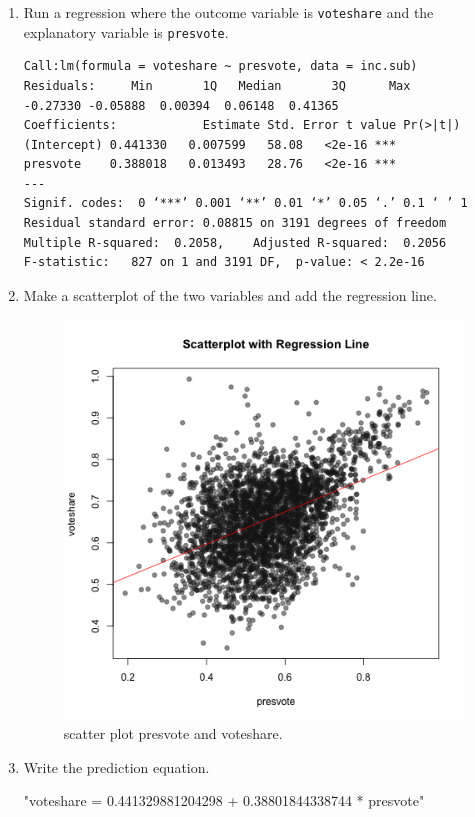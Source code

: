 \documentclass[12pt,letterpaper]{article}
\begin{document}
	\begin{enumerate}
		\item Run a regression where the outcome variable is \texttt{voteshare} and the explanatory variable is \texttt{presvote}.
 	
\begin{verbatim}
Call:lm(formula = voteshare ~ presvote, data = inc.sub)
Residuals:     Min       1Q   Median       3Q      Max 
-0.27330 -0.05888  0.00394  0.06148  0.41365 
Coefficients:            Estimate Std. Error t value Pr(>|t|)    
(Intercept) 0.441330   0.007599   58.08   <2e-16 ***
presvote    0.388018   0.013493   28.76   <2e-16 ***
---
Signif. codes:  0 ‘***’ 0.001 ‘**’ 0.01 ‘*’ 0.05 ‘.’ 0.1 ‘ ’ 1
Residual standard error: 0.08815 on 3191 degrees of freedom
Multiple R-squared:  0.2058,	Adjusted R-squared:  0.2056 
F-statistic:   827 on 1 and 3191 DF,  p-value: < 2.2e-16
\end{verbatim} 	
			\vspace{3cm}
		\item Make a scatterplot of the two variables and add the regression line. 
 	

	\begin{figure}[h!]\centering
		\caption{\footnotesize scatter plot presvote and voteshare.}
		\label{fig:plot_3}
		\includegraphics[width=.65\textwidth]{scatterplot_voteshare_presvote.png}
	\end{figure}

			\vspace{5cm}
		\item Write the prediction equation.
 	
"voteshare = 0.441329881204298 + 0.38801844338744 * presvote"
	\end{enumerate}
	
\end{document}
